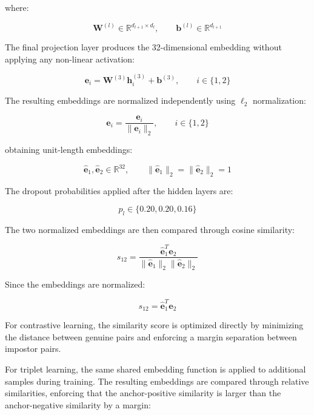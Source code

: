 where:

\begin{equation}
\mathbf{W}^{(l)}
\in
\mathbb{R}^{d_{l+1}\times d_l},
\qquad
\mathbf{b}^{(l)}
\in
\mathbb{R}^{d_{l+1}}
\end{equation}

The final projection layer produces the 32-dimensional embedding without applying any non-linear activation:

\begin{equation}
\mathbf{e}_i
=
\mathbf{W}^{(3)}
\mathbf{h}^{(3)}_i
+
\mathbf{b}^{(3)},
\qquad i\in\{1,2\}
\end{equation}

The resulting embeddings are normalized independently using $\ell_2$ normalization:

\begin{equation}
\hat{\mathbf{e}}_i
=
\frac{\mathbf{e}_i}
{\|\mathbf{e}_i\|_2},
\qquad i\in\{1,2\}
\end{equation}

obtaining unit-length embeddings:

\begin{equation}
\hat{\mathbf{e}}_1,\hat{\mathbf{e}}_2\in\mathbb{R}^{32},
\qquad
\|\hat{\mathbf{e}}_1\|_2=\|\hat{\mathbf{e}}_2\|_2=1
\end{equation}

The dropout probabilities applied after the hidden layers are:

\begin{equation}
p_l\in\{0.20,0.20,0.16\}
\end{equation}

The two normalized embeddings are then compared through cosine similarity:

\begin{equation}
s_{12}
=
\frac{\hat{\mathbf{e}}_1^T\hat{\mathbf{e}}_2}
{\|\hat{\mathbf{e}}_1\|_2\|\hat{\mathbf{e}}_2\|_2}
\end{equation}

Since the embeddings are normalized:

\begin{equation}
s_{12}=\hat{\mathbf{e}}_1^T\hat{\mathbf{e}}_2
\end{equation}

For contrastive learning, the similarity score is optimized directly by minimizing the distance between genuine pairs and enforcing a margin separation between impostor pairs.

For triplet learning, the same shared embedding function is applied to additional samples during training. The resulting embeddings are compared through relative similarities, enforcing that the anchor-positive similarity is larger than the anchor-negative similarity by a margin:

